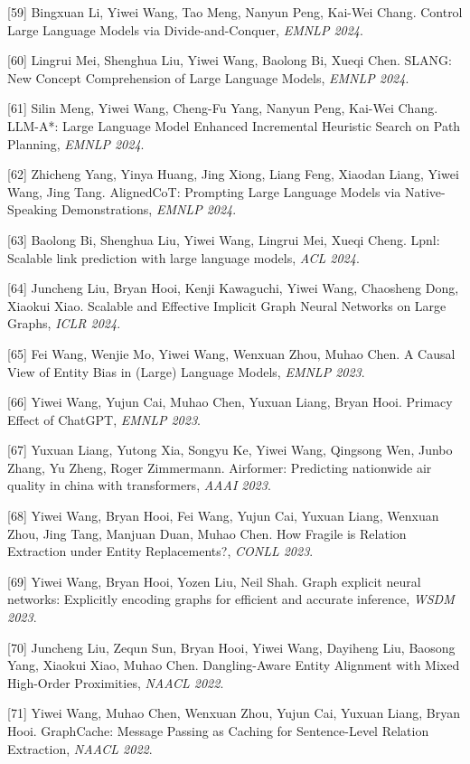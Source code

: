 [59] Bingxuan Li, Yiwei Wang, Tao Meng, Nanyun Peng, Kai-Wei Chang. Control Large Language Models via Divide-and-Conquer, \textit{EMNLP 2024}.

[60] Lingrui Mei, Shenghua Liu, Yiwei Wang, Baolong Bi, Xueqi Chen. SLANG: New Concept Comprehension of Large Language Models, \textit{EMNLP 2024}.

[61] Silin Meng, Yiwei Wang, Cheng-Fu Yang, Nanyun Peng, Kai-Wei Chang. LLM-A*: Large Language Model Enhanced Incremental Heuristic Search on Path Planning, \textit{EMNLP 2024}.

[62] Zhicheng Yang, Yinya Huang, Jing Xiong, Liang Feng, Xiaodan Liang, Yiwei Wang, Jing Tang. AlignedCoT: Prompting Large Language Models via Native-Speaking Demonstrations, \textit{EMNLP 2024}.

[63] Baolong Bi, Shenghua Liu, Yiwei Wang, Lingrui Mei, Xueqi Cheng. Lpnl: Scalable link prediction with large language models, \textit{ACL 2024}.

[64] Juncheng Liu, Bryan Hooi, Kenji Kawaguchi, Yiwei Wang, Chaosheng Dong, Xiaokui Xiao. Scalable and Effective Implicit Graph Neural Networks on Large Graphs, \textit{ICLR 2024}.

[65] Fei Wang, Wenjie Mo, Yiwei Wang, Wenxuan Zhou, Muhao Chen. A Causal View of Entity Bias in (Large) Language Models, \textit{EMNLP 2023}.

[66] Yiwei Wang, Yujun Cai, Muhao Chen, Yuxuan Liang, Bryan Hooi. Primacy Effect of ChatGPT, \textit{EMNLP 2023}.

[67] Yuxuan Liang, Yutong Xia, Songyu Ke, Yiwei Wang, Qingsong Wen, Junbo Zhang, Yu Zheng, Roger Zimmermann. Airformer: Predicting nationwide air quality in china with transformers, \textit{AAAI 2023}.

[68] Yiwei Wang, Bryan Hooi, Fei Wang, Yujun Cai, Yuxuan Liang, Wenxuan Zhou, Jing Tang, Manjuan Duan, Muhao Chen. How Fragile is Relation Extraction under Entity Replacements?, \textit{CONLL 2023}.

[69] Yiwei Wang, Bryan Hooi, Yozen Liu, Neil Shah. Graph explicit neural networks: Explicitly encoding graphs for efficient and accurate inference, \textit{WSDM 2023}.

[70] Juncheng Liu, Zequn Sun, Bryan Hooi, Yiwei Wang, Dayiheng Liu, Baosong Yang, Xiaokui Xiao, Muhao Chen. Dangling-Aware Entity Alignment with Mixed High-Order Proximities, \textit{NAACL 2022}.

[71] Yiwei Wang, Muhao Chen, Wenxuan Zhou, Yujun Cai, Yuxuan Liang, Bryan Hooi. GraphCache: Message Passing as Caching for Sentence-Level Relation Extraction, \textit{NAACL 2022}.

